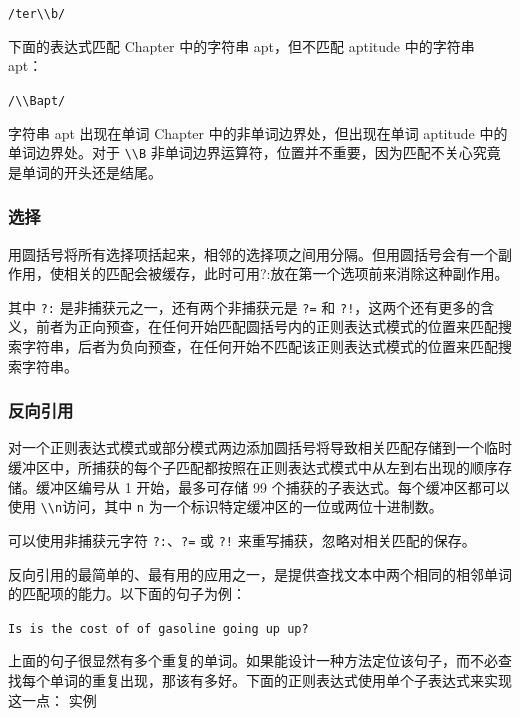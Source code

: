 \documentclass[doctor,openright,twoside]{sjtuthesis}
\newcommand{\passthrough}[1]{#1}
\theoremstyle{plain}
\theoremstyle{definition}
\theoremstyle{remark}
\theoremstyle{ocrenumbox}
\theoremstyle{plain}
\begin{document}
\passthrough{\lstinline!/ter\\b/!}

下面的表达式匹配 Chapter 中的字符串 apt，但不匹配 aptitude 中的字符串 apt：

\passthrough{\lstinline!/\\Bapt/!}

字符串 apt 出现在单词 Chapter 中的非单词边界处，但出现在单词 aptitude 中的单词边界处。对于 \passthrough{\lstinline!\\B!} 非单词边界运算符，位置并不重要，因为匹配不关心究竟是单词的开头还是结尾。

\hypertarget{section-90}{%
\subsubsection{选择}\label{section-90}}

用圆括号将所有选择项括起来，相邻的选择项之间用\textbar 分隔。但用圆括号会有一个副作用，使相关的匹配会被缓存，此时可用?:放在第一个选项前来消除这种副作用。

其中 \passthrough{\lstinline!?:!} 是非捕获元之一，还有两个非捕获元是 \passthrough{\lstinline!?=!} 和 \passthrough{\lstinline"?!"}，这两个还有更多的含义，前者为正向预查，在任何开始匹配圆括号内的正则表达式模式的位置来匹配搜索字符串，后者为负向预查，在任何开始不匹配该正则表达式模式的位置来匹配搜索字符串。

\hypertarget{section-91}{%
\subsubsection{反向引用}\label{section-91}}

对一个正则表达式模式或部分模式两边添加圆括号将导致相关匹配存储到一个临时缓冲区中，所捕获的每个子匹配都按照在正则表达式模式中从左到右出现的顺序存储。缓冲区编号从 1 开始，最多可存储 99 个捕获的子表达式。每个缓冲区都可以使用 \passthrough{\lstinline!\\n!}访问，其中 \passthrough{\lstinline!n!} 为一个标识特定缓冲区的一位或两位十进制数。

可以使用非捕获元字符 \passthrough{\lstinline!?:!}、\passthrough{\lstinline!?=!} 或 \passthrough{\lstinline"?!"} 来重写捕获，忽略对相关匹配的保存。

反向引用的最简单的、最有用的应用之一，是提供查找文本中两个相同的相邻单词的匹配项的能力。以下面的句子为例：

\passthrough{\lstinline!Is is the cost of of gasoline going up up?!}

上面的句子很显然有多个重复的单词。如果能设计一种方法定位该句子，而不必查找每个单词的重复出现，那该有多好。下面的正则表达式使用单个子表达式来实现这一点：
实例
\end{document}
